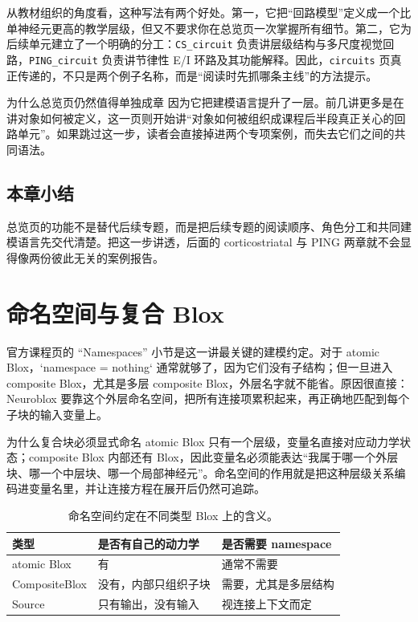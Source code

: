 \documentclass[a4paper]{article}
\begin{document}
从教材组织的角度看，这种写法有两个好处。第一，它把“回路模型”定义成一个比单神经元更高的教学层级，但又不要求你在总览页一次掌握所有细节。第二，它为后续单元建立了一个明确的分工：\texttt{CS\_circuit} 负责讲层级结构与多尺度视觉回路，\texttt{PING\_circuit} 负责讲节律性 E/I 环路及其功能解释。因此，\texttt{circuits} 页真正传递的，不只是两个例子名称，而是“阅读时先抓哪条主线”的方法提示。

\begin{knowledgebox}{为什么总览页仍然值得单独成章}
因为它把建模语言提升了一层。前几讲更多是在讲对象如何被定义，这一页则开始讲“对象如何被组织成课程后半段真正关心的回路单元”。如果跳过这一步，读者会直接掉进两个专项案例，而失去它们之间的共同语法。
\end{knowledgebox}

\subsection{本章小结}
总览页的功能不是替代后续专题，而是把后续专题的阅读顺序、角色分工和共同建模语言先交代清楚。把这一步讲透，后面的 corticostriatal 与 PING 两章就不会显得像两份彼此无关的案例报告。

\section{命名空间与复合 Blox}
官方课程页的 ``Namespaces'' 小节是这一讲最关键的建模约定。对于 atomic Blox，`namespace = nothing` 通常就够了，因为它们没有子结构；但一旦进入 composite Blox，尤其是多层 composite Blox，外层名字就不能省。原因很直接：Neuroblox 要靠这个外层命名空间，把所有连接项累积起来，再正确地匹配到每个子块的输入变量上。

\begin{knowledgebox}{为什么复合块必须显式命名}
atomic Blox 只有一个层级，变量名直接对应动力学状态；composite Blox 内部还有 Blox，因此变量名必须能表达“我属于哪一个外层块、哪一个中层块、哪一个局部神经元”。命名空间的作用就是把这种层级关系编码进变量名里，并让连接方程在展开后仍然可追踪。
\end{knowledgebox}

\begin{table}[H]
\centering
\begin{tabular}{@{}lll@{}}
\toprule
类型 & 是否有自己的动力学 & 是否需要 namespace \\
\midrule
atomic Blox & 有 & 通常不需要 \\
CompositeBlox & 没有，内部只组织子块 & 需要，尤其是多层结构 \\
Source & 只有输出，没有输入 & 视连接上下文而定 \\
\bottomrule
\end{tabular}
\caption{命名空间约定在不同类型 Blox 上的含义。}
\end{table}
\end{document}
